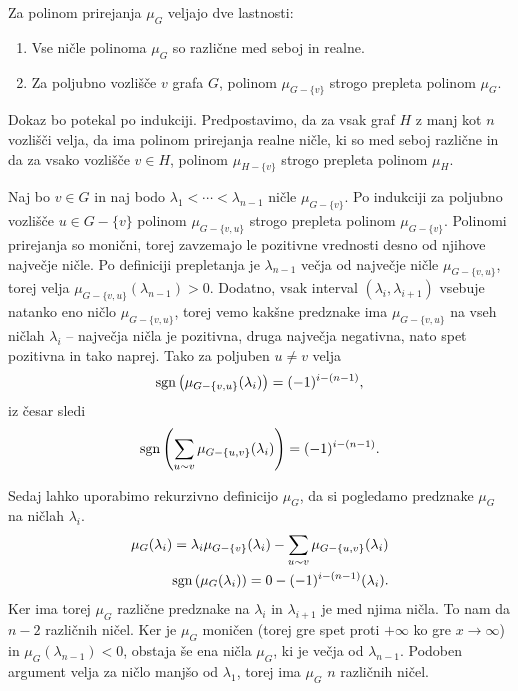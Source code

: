 \begin{izrek}
    Za polinom prirejanja \(\mu_G\) veljajo dve lastnosti:
    \begin{enumerate}
        \item Vse ničle polinoma \(\mu_G\) so različne med seboj in realne.
        \item Za poljubno vozlišče \(v\) grafa \(G\), polinom \(\mu_{G-\{v\}}\) strogo prepleta polinom \(\mu_G\).
    \end{enumerate}
\end{izrek}
\begin{dokaz}
    Dokaz bo potekal po indukciji. Predpostavimo, da za vsak graf \(H\) z manj kot \(n\) vozlišči velja, da ima polinom prirejanja realne ničle, ki so med seboj različne in da za vsako vozlišče \(v\in H\), polinom \(\mu_{H-\{v\}}\) strogo prepleta polinom \(\mu_H\).

    Naj bo \(v\in G\) in naj bodo \(\lambda_1 < \cdots < \lambda_{n-1}\) ničle \(\mu_{G-\{v\}}\). Po indukciji za poljubno vozlišče \(u\in G-\{v\}\) polinom \(\mu_{G-\{v, u\}}\) strogo prepleta polinom \(\mu_{G-\{v\}}\). Polinomi prirejanja so monični, torej zavzemajo le pozitivne vrednosti desno od njihove največje ničle. Po definiciji prepletanja je \(\lambda_{n-1}\) večja od največje ničle \(\mu_{G-\{v, u\}}\), torej velja \(\mu_{G-\{v, u\}}(\lambda_{n-1}) > 0\). Dodatno, vsak interval \((\lambda_i, \lambda_{i+1})\) vsebuje natanko eno ničlo \(\mu_{G-\{v, u\}}\), torej vemo kakšne predznake ima \(\mu_{G-\{v, u\}}\) na vseh ničlah \(\lambda_i\) -- največja ničla je pozitivna, druga največja negativna, nato spet pozitivna in tako naprej. Tako za poljuben \(u\neq v\) velja
    \begin{align*}
        \operatorname{sgn}\left({\mu_{G-\{v, u\}}(\lambda_i)}\right) = (-1)^{i-(n-1)},
    \end{align*}
    iz česar sledi
    \begin{align*}
        \operatorname{sgn}\left({\sum_{u\sim v} \mu_{G-\{u, v\}}(\lambda_i)}\right) = (-1)^{i - (n-1)}.
    \end{align*}

    Sedaj lahko uporabimo rekurzivno definicijo \(\mu_G\), da si pogledamo predznake \(\mu_G\) na ničlah \(\lambda_i\).
    \begin{align*}
        \mu_G(\lambda_i) = \lambda_i \mu_{G-\{v\}}(\lambda_i) - \sum_{u\sim v} \mu_{G-\{u, v\}}(\lambda_i) \\
        \operatorname{sgn}\left({\mu_G(\lambda_i)}\right) = 0 - (-1)^{i-(n-1)} (\lambda_i).
    \end{align*}
    Ker ima torej \(\mu_G\) različne predznake na \(\lambda_i\) in \(\lambda_{i+1}\) je med njima ničla. To nam da \(n-2\) različnih ničel. Ker je \(\mu_G\) moničen (torej gre spet proti \(+\infty\) ko gre \(x\to \infty\)) in \(\mu_G(\lambda_{n-1}) < 0\), obstaja še ena ničla \(\mu_G\), ki je večja od \(\lambda_{n-1}\). Podoben argument velja za ničlo manjšo od \(\lambda_1\), torej ima \(\mu_G\) \(n\) različnih ničel.
\end{dokaz}


